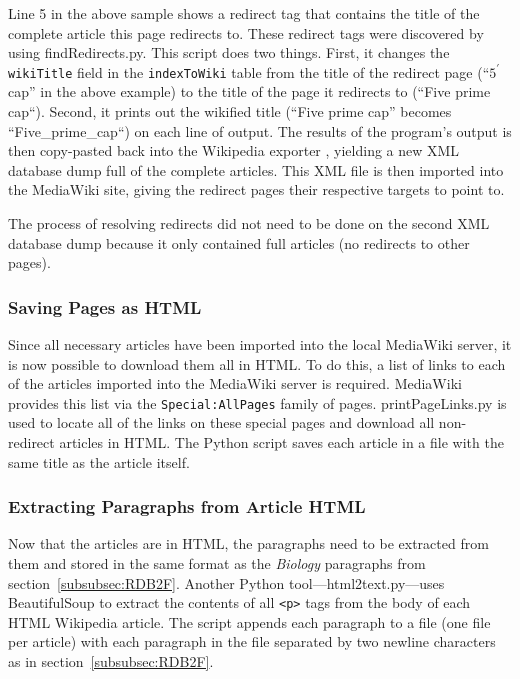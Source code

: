 Line 5 in the above sample shows a redirect tag that contains the title of the complete article this page redirects to.
These redirect tags were discovered by using findRedirects.py.
This script does two things.
First, it changes the {\tt wikiTitle} field in the {\tt indexToWiki} table from the title of the redirect page (``$5^\prime$ cap'' in the above example) to the title of the page it redirects to (``Five prime cap``).
Second, it prints out the wikified title (``Five prime cap'' becomes ``Five\_prime\_cap``) on each line of output.
The results of the program's output is then copy-pasted back into the Wikipedia exporter \cite{wiki-exporter}, yielding a new XML database dump full of the complete articles.
This XML file is then imported into the MediaWiki site, giving the redirect pages their respective targets to point to.

The process of resolving redirects did not need to be done on the second XML database dump because it only contained full articles (no redirects to other pages).

\subsubsection{Saving Pages as HTML}
\label{sec:html-pages}

Since all necessary articles have been imported into the local MediaWiki server, it is now possible to download them all in HTML.
To do this, a list of links to each of the articles imported into the MediaWiki server is required.
MediaWiki provides this list via the {\tt Special:AllPages} family of pages.
printPageLinks.py is used to locate all of the links on these special pages and download all non-redirect articles in HTML.
The Python script saves each article in a file with the same title as the article itself.

\subsubsection{Extracting Paragraphs from Article HTML}

Now that the articles are in HTML, the paragraphs need to be extracted from them and stored in the same format as the {\it Biology} paragraphs from section~\ref{subsubsec:RDB2F}.
Another Python tool---html2text.py---uses BeautifulSoup \cite{beautifulsoup} to extract the contents of all {\tt <p>} tags from the body of each HTML Wikipedia article.
The script appends each paragraph to a file (one file per article) with each paragraph in the file separated by two newline characters as in section~\ref{subsubsec:RDB2F}.

